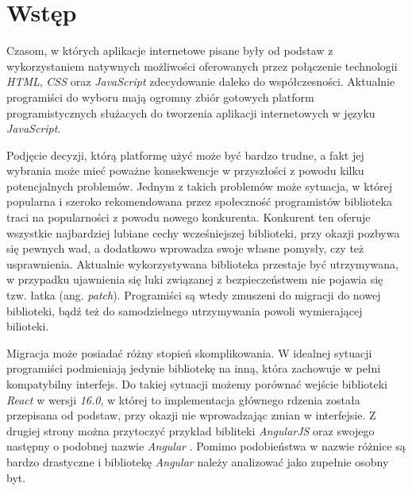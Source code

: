 \documentclass[polish, twoside, 12pt]{mwart}
\let\stdsection\section
\renewcommand*{\section}{\clearpage\stdsection}
\begin{document}

 
\newpage

\tableofcontents

\newpage

\listoffigures
 
\listoftables

\newpage

\section{Wstęp}

Czasom, w których aplikacje internetowe pisane były od podstaw z wykorzystaniem natywnych możliwości oferowanych przez połączenie technologii \emph{HTML}, \emph{CSS} oraz \emph{JavaScript} zdecydowanie daleko do współczesności. Aktualnie programiści do wyboru mają ogromny zbiór gotowych platform programistycznych służacych do tworzenia aplikacji internetowych w języku \emph{JavaScript}.

Podjęcie decyzji, którą platformę użyć może być bardzo trudne, a fakt jej wybrania może mieć poważne konsekwencje w przyszłości z powodu kilku potencjalnych problemów. Jednym z takich problemów może sytuacja, w której popularna i szeroko rekomendowana przez społeczność programistów biblioteka traci na popularności z powodu nowego konkurenta. Konkurent ten oferuje wszystkie najbardziej lubiane cechy wcześniejszej biblioteki, przy okazji pozbywa się pewnych wad, a dodatkowo wprowadza swoje własne pomysły, czy też usprawnienia. Aktualnie wykorzystywana biblioteka przestaje być utrzymywana, w przypadku ujawnienia się luki związanej z bezpieczeństwem nie pojawia się tzw. łatka (ang. \emph{patch}). Programiści są wtedy zmuszeni do migracji do nowej biblioteki, bądź też do samodzielnego utrzymywania powoli wymierającej bilioteki.

Migracja może posiadać różny stopień skomplikowania. W idealnej sytuacji programiści podmieniają jedynie bibliotekę na inną, która zachowuje w pełni kompatybilny interfejs. Do takiej sytuacji możemy porównać wejście biblioteki \emph{React} \cite{react} w wersji \emph{16.0}, w której to implementacja głównego rdzenia została przepisana od podstaw, przy okazji nie wprowadzając zmian w interfejsie. Z drugiej strony można przytoczyć przykład bibliteki \emph{AngularJS} \cite{angularjs} oraz swojego następny o podobnej nazwie \emph{Angular} \cite{angular}. Pomimo podobieństwa w nazwie różnice są bardzo drastyczne i bibliotekę \emph{Angular} należy analizować jako zupełnie osobny byt.
\end{document}

